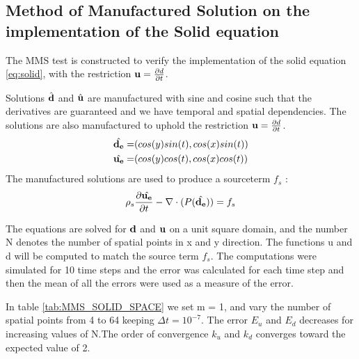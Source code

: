 \subsection{Method of Manufactured Solution on the implementation of the Solid equation}
The MMS test is constructed to verify the implementation of the solid equation \eqref{eq:solid}, with the restriction $\bold{u}=\frac{\partial d}{\partial t}$.

Solutions $\hat{\bold{d}}$ and $\hat{\bold{u}}$ are manufactured with sine and cosine such that the derivatives are guaranteed and we have temporal and spatial dependencies.
The solutions are also manufactured to uphold the restriction $\bold{u}=\frac{\partial d}{\partial t}$.
\begin{align*}
\hat{\bold{d_e}} =& ( cos(y)sin(t) , cos(x)sin(t) )\\
\hat{\bold{u_e}} =& ( cos(y)cos(t), cos(x)cos(t) )
\end{align*}
The manufactured solutions are used to produce a sourceterm $f_s$ :
\begin{equation}
\rho_s \frac{\partial \hat{\bold{u_e}}}{\partial t} - \nabla \cdot ( P(\hat{\bold{d_e}}) ) = f_s 
\end{equation}

The equations are solved for $\bold{d}$ and $\bold{u}$ on a unit square domain, and the number N denotes the number of spatial points in x and y direction. The functions u and d will be computed to match the source term $f_s$. 
The computations were simulated for 10 time steps and the error was calculated for each time step and then the mean of all the errors were used as a measure of the error.

In table \ref{tab:MMS_SOLID_SPACE} we set m = 1, and vary the number of spatial points from 4 to 64 keeping $\Delta t = 10^{-7}$. The error $E_u$ and $E_d$ decreases for increasing values of N.The order of convergence $k_u$ and $k_d$ converges toward the expected value of 2.

